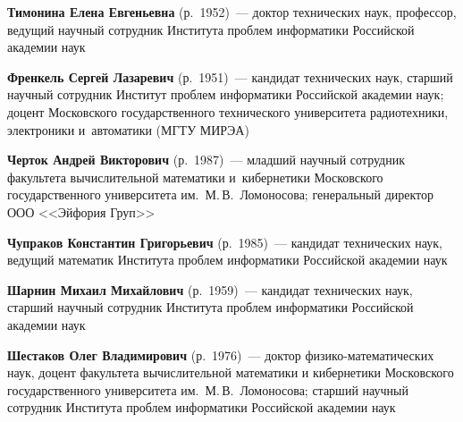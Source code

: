 \begin{multicols}{2}
\vspace*{2pt}

\noindent
\textbf{Тимонина Елена Евгеньевна} (р.\ 1952)~---
доктор технических наук, профессор, ведущий научный сотрудник Института
проблем информатики Российской академии наук


\columnbreak


\noindent
\textbf{Френкель Сергей Лазаревич} (р.\ 1951)~---
кандидат технических наук, старший научный сотрудник Институт проблем информатики
Российской академии наук; доцент Московского государственного технического
университета радиотехники, электроники и~автоматики (МГТУ МИРЭА)

\vspace*{2pt}


\noindent
\textbf{Черток Андрей Викторович} (р.\ 1987)~---
младший науч\-ный сотрудник факультета вычислительной математики
и~кибернетики Московского государственного университета им.\ М.\,В.~Ломоносова;
генеральный директор ООО <<Эйфория Груп>>

\vspace*{2pt}

\noindent
\textbf{Чупраков Константин Григорьевич} (р.\ 1985)~---
кандидат технических наук, ведущий математик Института проблем
информатики Российской академии наук

\vspace*{2pt}

\noindent
\textbf{Шарнин Михаил Михайлович} (р.\ 1959)~---
 кандидат технических наук, старший научный сотрудник Института
 проблем информатики Российской академии наук

\vspace*{2pt}

 \noindent
\textbf{Шестаков Олег Владимирович} (р.\ 1976)~---
доктор фи\-зи\-ко-ма\-те\-ма\-ти\-че\-ских наук, доцент факультета вычислительной
математики и кибернетики Московского государственного университета
им.~М.\,В.~Ломоносова; старший научный сотрудник Института проблем информатики
Российской академии наук





 \label{end\stat}










\end{multicols}

\newpage